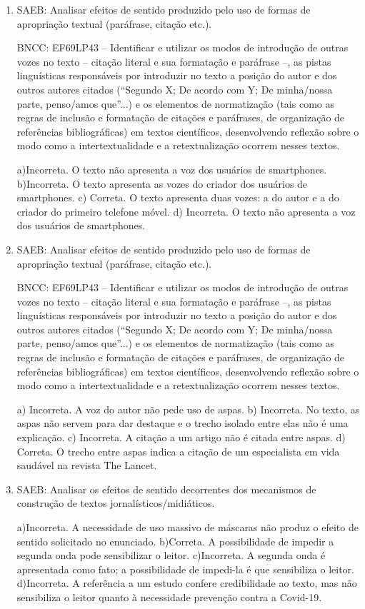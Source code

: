 
\begin{enumerate}

\item
SAEB: Analisar efeitos de sentido produzido pelo uso de formas de
apropriação textual (paráfrase, citação etc.).

BNCC: EF69LP43 -- Identificar e utilizar os modos de introdução de
outras vozes no texto -- citação literal e sua formatação e paráfrase
--, as pistas linguísticas responsáveis por introduzir no texto a
posição do autor e dos outros autores citados (``Segundo X; De acordo
com Y; De minha/nossa parte, penso/amos que''...) e os elementos de
normatização (tais como as regras de inclusão e formatação de citações e
paráfrases, de organização de referências bibliográficas) em textos
científicos, desenvolvendo reflexão sobre o modo como a
intertextualidade e a retextualização ocorrem nesses textos.

a)Incorreta. O texto não apresenta a voz dos usuários de smartphones.
b)Incorreta. O texto apresenta as vozes do criador dos usuários de
smartphones. 
c) Correta. O texto apresenta duas vozes: a do autor e a do criador
do primeiro telefone móvel.
d) Incorreta. O texto não apresenta a voz dos usuários de smartphones.

\item
SAEB: Analisar efeitos de sentido produzido pelo uso de formas de
apropriação textual (paráfrase, citação etc.).

BNCC: EF69LP43 -- Identificar e utilizar os modos de introdução de
outras vozes no texto -- citação literal e sua formatação e paráfrase
--, as pistas linguísticas responsáveis por introduzir no texto a
posição do autor e dos outros autores citados (``Segundo X; De acordo
com Y; De minha/nossa parte, penso/amos que''...) e os elementos de
normatização (tais como as regras de inclusão e formatação de citações e
paráfrases, de organização de referências bibliográficas) em textos
científicos, desenvolvendo reflexão sobre o modo como a
intertextualidade e a retextualização ocorrem nesses textos.

a) Incorreta. A voz do autor não pede uso de aspas. 
b) Incorreta. No texto, as aspas não servem para dar destaque e o trecho isolado entre 
elas não é uma explicação.
c) Incorreta. A citação a um artigo não é citada entre aspas.
d) Correta. O trecho entre aspas indica a citação de um especialista em 
vida saudável na revista The Lancet.

\item
SAEB: Analisar os efeitos de sentido decorrentes dos mecanismos de construção
de textos jornalísticos/midiáticos.

a)Incorreta. A necessidade de uso massivo de máscaras não produz o efeito de sentido
solicitado no enunciado. 
b)Correta. A possibilidade de impedir a segunda onda pode sensibilizar o leitor.
c)Incorreta. A segunda onda é apresentada como fato; a possibilidade de
impedi-la é que sensibiliza o leitor.
d)Incorreta. A referência a um estudo confere credibilidade ao texto, mas 
não sensibiliza o leitor quanto à necessidade prevenção contra a Covid-19.

\end{enumerate}

